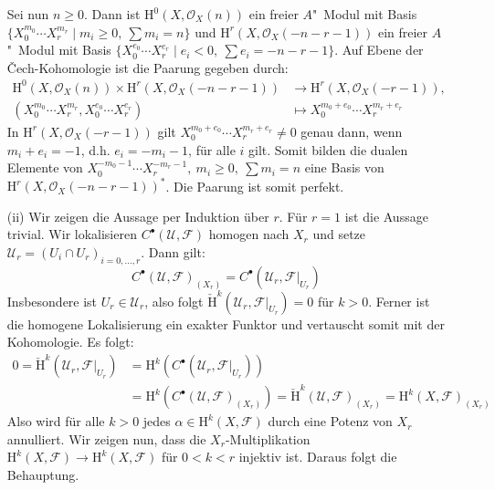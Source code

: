 \begin{enumerate}
Sei nun $n\geq 0$. Dann ist $\mathrm{H}^0(X,\mathcal{O}_X(n))$ ein freier $A$"~Modul mit Basis $\{X_0^{m_0}\cdots X_r^{m_r}\mid m_i\geq 0,\ \sum m_i=n\}$ und $\mathrm{H}^r(X,\mathcal{O}_X(-n-r-1))$ ein freier $A$"~Modul mit Basis $\{X_0^{e_0}\cdots X_r^{e_r}\mid e_i<0,\ \sum e_i = -n-r-1\}$. Auf Ebene der Čech-Kohomologie ist die Paarung gegeben durch:
\begin{align*}
\mathrm{H}^0(X,\mathcal{O}_X(n))\times\mathrm{H}^r(X,\mathcal{O}_X(-n-r-1))&\to\mathrm{H}^r(X,\mathcal{O}_X(-r-1)),\\
(X_0^{m_0}\cdots X_r^{m_r}, X_0^{e_0}\cdots X_r^{e_r})&\mapsto X_0^{m_0+e_0}\cdots X_r^{m_r+e_r}
\end{align*}
In $\mathrm{H}^r(X,\mathcal{O}_X(-r-1))$ gilt $X_0^{m_0+e_0}\cdots X_r^{m_r+e_r}\neq 0$ genau dann, wenn $m_i+e_i = -1$, d.h. $e_i=-m_i-1$, für alle $i$ gilt. Somit bilden die dualen Elemente von $X_0^{-m_0-1}\cdots X_r^{-m_r-1},\ m_i\geq 0,\ \sum m_i =n$ eine Basis von $\mathrm{H}^r(X,\mathcal{O}_X(-n-r-1))^\ast$. Die Paarung ist somit perfekt.
\item[(ii)] Wir zeigen die Aussage per Induktion über $r$. Für $r=1$ ist die Aussage trivial. Wir lokalisieren $C^\bullet(\mathcal{U},\mathcal{F})$ homogen nach $X_r$ und setze $\mathcal{U}_r = (U_i\cap U_r)_{i=0,\ldots,r}$. Dann gilt:
\[C^\bullet(\mathcal{U},\mathcal{F})_{(X_r)} = C^\bullet(\mathcal{U}_r,\mathcal{F}|_{U_r}) \]
Insbesondere ist $U_r\in\mathcal{U}_r$, also folgt $\check{\mathrm{H}}^k(\mathcal{U}_r,\mathcal{F}|_{U_r})=0$ für $k>0$. Ferner ist die homogene Lokalisierung ein exakter Funktor und vertauscht somit mit der Kohomologie. Es folgt:
\begin{align*}
0 = \check{\mathrm{H}}^k(\mathcal{U}_r,\mathcal{F}|_{U_r}) &= \mathrm{H}^k(C^\bullet(\mathcal{U}_r,\mathcal{F}|_{U_r}))\\
&= \mathrm{H}^k(C^\bullet(\mathcal{U},\mathcal{F})_{(X_r)})
= \check{\mathrm{H}}^k(\mathcal{U},\mathcal{F})_{(X_r)} = \mathrm{H}^k(X,\mathcal{F})_{(X_r)}
\end{align*}
Also wird für alle $k>0$ jedes $\alpha\in\mathrm{H}^k(X,\mathcal{F})$ durch eine Potenz von $X_r$ annulliert. Wir zeigen nun, dass die $X_r$-Multiplikation $\mathrm{H}^k(X,\mathcal{F})\to\mathrm{H}^k(X,\mathcal{F})$ für $0<k<r$ injektiv ist. Daraus folgt die Behauptung.


\end{enumerate}

